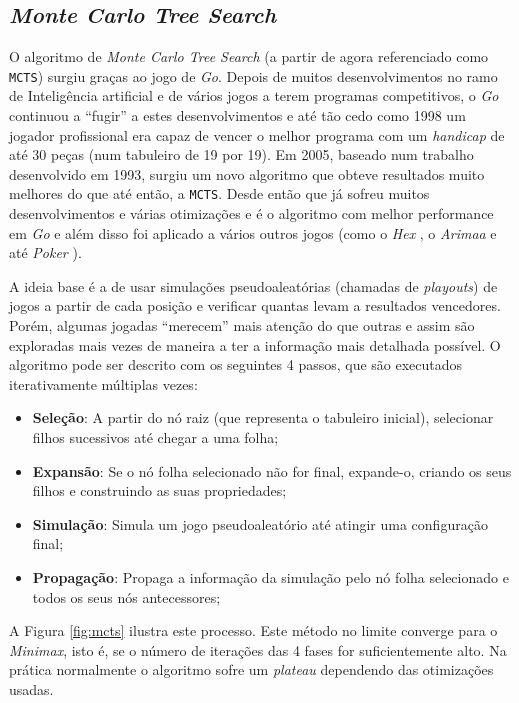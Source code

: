 \documentclass[12pt,a4paper,oneside]{article}
\begin{document}
\newpage

\subsection{\textit{Monte Carlo Tree Search}}
\label{ssec:mcts}

O algoritmo de \textit{Monte Carlo Tree Search} (a partir de agora
referenciado como \texttt{MCTS}) surgiu graças ao jogo de
\textit{Go}. Depois de muitos desenvolvimentos no ramo de Inteligência
artificial e de vários jogos a terem programas competitivos, o
\textit{Go} continuou a ``fugir'' a estes desenvolvimentos e até tão
cedo como 1998 um jogador profissional era capaz de vencer o melhor
programa com um \textit{handicap} de até 30 peças (num tabuleiro de 19
por 19).  Em 2005, baseado num trabalho desenvolvido em
1993\cite{Brugmann:1993}, surgiu um novo algoritmo que obteve
resultados muito melhores do que até então, a \texttt{MCTS}. Desde
então que já sofreu muitos desenvolvimentos e várias otimizações e é o
algoritmo com melhor performance em \textit{Go} e além disso foi
aplicado a vários outros jogos (como o \textit{Hex}
\cite{Arneson:2009}, o \textit{Arimaa} \cite{Kozelek:2009} e até
\textit{Poker} \cite{Rubin:2011}).

A ideia base é a de usar simulações pseudoaleatórias (chamadas de
\textit{playouts}) de jogos a partir de cada posição e verificar
quantas levam a resultados vencedores. Porém, algumas jogadas
``merecem'' mais atenção do que outras e assim são exploradas mais
vezes de maneira a ter a informação mais detalhada possível. O
algoritmo pode ser descrito com os seguintes 4 passos, que são
executados iterativamente múltiplas vezes:

\begin{itemize}
  \item \textbf{Seleção}: A partir do nó raiz (que representa o
    tabuleiro inicial), selecionar filhos sucessivos até chegar a uma
    folha;
  \item \textbf{Expansão}: Se o nó folha selecionado não for final,
    expande-o, criando os seus filhos e construindo as suas
    propriedades;
  \item \textbf{Simulação}: Simula um jogo pseudoaleatório até atingir
    uma configuração final;
  \item \textbf{Propagação}: Propaga a informação da simulação pelo nó
    folha selecionado e todos os seus nós antecessores;
\end{itemize}

A Figura \ref{fig:mcts} ilustra este processo. Este método no limite
converge para o \textit{Minimax}, isto é, se o número de iterações das
4 fases for suficientemente alto. Na prática normalmente o algoritmo
sofre um \textit{plateau} dependendo das otimizações usadas.
\end{document}

